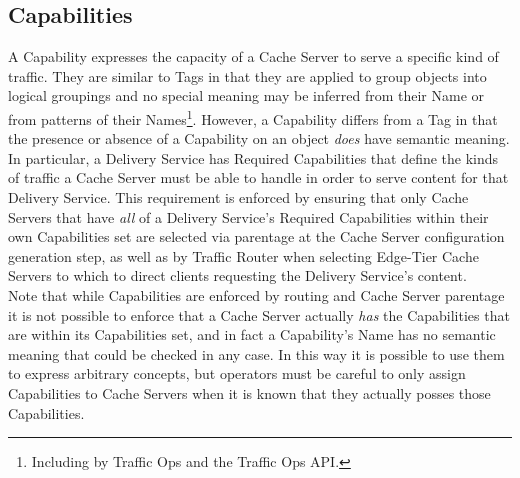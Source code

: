 %
%

\subsection{Capabilities}
A Capability expresses the capacity of a Cache Server to serve a specific kind
of traffic. They are similar to Tags in that they are applied to group objects
into logical groupings and no special meaning may be inferred from their Name
or from patterns of their Names\footnote{Including by Traffic Ops and the
Traffic Ops API.}. However, a Capability differs from a Tag in that the
presence or absence of a Capability on an object \emph{does} have semantic
meaning.\\
In particular, a Delivery Service has Required Capabilities that define the
kinds of traffic a Cache Server must be able to handle in order to serve
content for that Delivery Service. This requirement is enforced by ensuring
that only Cache Servers that have \emph{all} of a Delivery Service's Required
Capabilities within their own Capabilities set are selected via parentage at
the Cache Server configuration generation step, as well as by Traffic Router
when selecting Edge-Tier Cache Servers to which to direct clients requesting
the Delivery Service's content.\\
Note that while Capabilities are enforced by routing and Cache Server parentage
it is not possible to enforce that a Cache Server actually \emph{has} the
Capabilities that are within its Capabilities set, and in fact a Capability's
Name has no semantic meaning that could be checked in any case. In this way it
is possible to use them to express arbitrary concepts, but operators must be
careful to only assign Capabilities to Cache Servers when it is known that they
actually posses those Capabilities.

